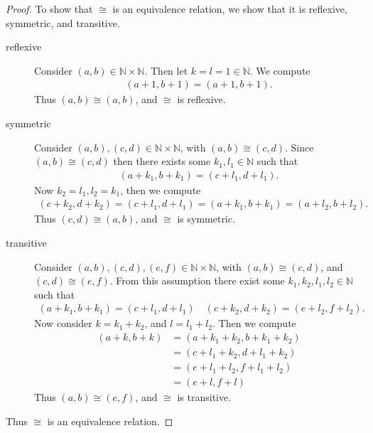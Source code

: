 \documentclass[10pt]{armath}
\newcommand{\N}{\mathbb{N}}
\newenvironment{claim}[1]{\par\noindent\textit{Claim:}\space#1}{}
\begin{document}
\begin{proof}
  To show that $\cong$ is an equivalence relation, we show that it is
  reflexive, symmetric, and transitive.
  \begin{description}
    \item[reflexive] Consider $(a,b)\in\N\times\N$. Then let $k=l=1\in\N$. We
      compute
      \begin{align*}
        (a+1,b+1)=(a+1,b+1).
      \end{align*}
      Thus $(a,b)\cong(a,b)$, and $\cong$ is reflexive.
    \item[symmetric] Consider $(a,b),(c,d)\in\N\times\N$, with
      $(a,b)\cong(c,d)$. Since $(a,b)\cong(c,d)$ then there exists some
      $k_1,l_1\in\N$ such that
      \begin{align*}
        (a+k_1,b+k_1)=(c+l_1,d+l_1).
      \end{align*}
      Now $k_2=l_1,l_2=k_1$, then we compute
      \begin{align*}
        (c+k_2,d+k_2)=(c+l_1,d+l_1)=(a+k_1,b+k_1)=(a+l_2,b+l_2).
      \end{align*}
      Thus $(c,d)\cong(a,b)$, and $\cong$ is symmetric.
    \item[transitive] Consider $(a,b),(c,d),(e,f)\in\N\times\N$, with
      $(a,b)\cong(c,d)$, and $(c,d)\cong(e,f)$. From this assumption there
      exist some $k_1,k_2,l_1,l_2\in\N$ such that
      \begin{align*}
        (a+k_1,b+k_1)=(c+l_1,d+l_1)\quad(c+k_2,d+k_2)=(e+l_2,f+l_2).
      \end{align*}
      Now consider $k=k_1+k_2$, and $l=l_1+l_2$. Then we compute
      \begin{align*}
        (a+k,b+k)&=(a+k_1+k_2,b+k_1+k_2)\\
        &=(c+l_1+k_2,d+l_1+k_2)\\
        &=(e+l_1+l_2,f+l_1+l_2)\\
        &=(e+l,f+l)
      \end{align*}
      Thus $(a,b)\cong(e,f)$, and $\cong$ is transitive.
  \end{description}
  Thus $\cong$ is an equivalence relation.
\end{proof}

\subsection{}%
\label{sub:1b}
\end{document}
